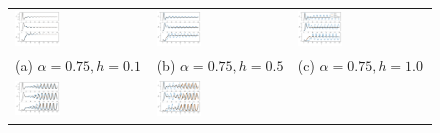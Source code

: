 \documentclass[11pt, oneside]{article}   	%
\begin{document}
	\hspace{-2mm}\begin{figure}[h!]
		\centering
		\begin{tabular}{lll}
			\includegraphics[width=0.35\textwidth]{figs/3SpeciesApprox75_1.pdf}
			&
			\hspace{-5mm}\includegraphics[width=0.35\textwidth]{figs/3SpeciesApprox75_5.pdf}
			&
			\hspace{-5mm}\includegraphics[width=0.35\textwidth]{figs/3SpeciesApprox75_10.pdf}\vspace{-3mm}
			\\
			{\scriptsize \hspace{4mm}(a) $\alpha = 0.75, h=0.1$} &
			{\scriptsize \hspace{4mm}(b) $\alpha = 0.75, h=0.5$}&
			{\scriptsize \hspace{4mm}(c) $\alpha = 0.75, h=1.0$}
			\\
			\includegraphics[width=0.35\textwidth]{figs/3SpeciesApprox120_1.pdf}
			&
			\hspace{-5mm}\includegraphics[width=0.35\textwidth]{figs/3SpeciesApprox120_5.pdf}

\end{tabular}
\end{figure}
\end{document}
